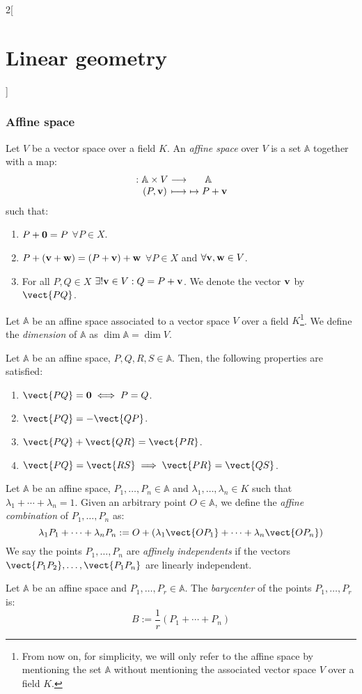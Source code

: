 \documentclass[../../../main.tex]{subfiles}
\begin{document}
\begin{multicols}{2}[\section{Linear geometry}]
  \subsubsection{Affine space}
  \begin{definition}
    Let $V$ be a vector space over a field $K$. An \emph{affine space} over $V$ is a set $\mathbb{A}$ together with a map:
    $$\function{}{\mathbb{A}\times V}{\mathbb{A}}{(P,\vf{v})}{\mapsto P+\vf{v}}$$
    such that:
    \begin{enumerate}
      \item $P+\boldsymbol{\mathrm{0}}=P$ $\forall P\in X$.
      \item $P+(\boldsymbol{\mathrm{v}}+\boldsymbol{\mathrm{w}})=(P+\boldsymbol{\mathrm{v}})+\boldsymbol{\mathrm{w}}$ $\forall P\in X$ and $\forall\boldsymbol{\mathrm{v}},\boldsymbol{\mathrm{w}}\in V$.
      \item For all $P,Q\in X$ $\exists!\boldsymbol{\mathrm{v}}\in V:Q=P+\boldsymbol{\mathrm{v}}$. We denote the vector $\boldsymbol{\mathrm{v}}$ by $\vect{PQ}$.
    \end{enumerate}
  \end{definition}
  \begin{definition}
    Let $\mathbb{A}$ be an affine space associated to a vector space $V$ over a field $K$\footnote{From now on, for simplicity, we will only refer to the affine space by mentioning the set $\mathbb{A}$ without mentioning the associated vector space $V$ over a field $K$.}. We define the \emph{dimension} of $\mathbb{A}$ as $\dim\mathbb{A}=\dim V$.
  \end{definition}
  \begin{proposition}
    Let $\mathbb{A}$ be an affine space, $P,Q,R,S\in\mathbb{A}$. Then, the following properties are satisfied:
    \begin{enumerate}
      \item $\vect{PQ}=\vf{0}\iff P=Q$.
      \item $\vect{PQ}=-\vect{QP}$.
      \item $\vect{PQ}+\vect{QR}=\vect{PR}$.
      \item $\vect{PQ}=\vect{RS}\implies\vect{PR}=\vect{QS}$.
    \end{enumerate}
  \end{proposition}
  \begin{definition}
    Let $\mathbb{A}$ be an affine space, $P_1,\ldots,P_n\in\mathbb{A}$ and $\lambda_1,\ldots,\lambda_n\in K$ such that $\lambda_1+\cdots+\lambda_n=1$. Given an arbitrary point $O\in\mathbb{A}$, we define the \emph{affine combination} of $P_1,\ldots,P_n$ as: $$\lambda_1P_1+\cdots+\lambda_nP_n:=O+\left(\lambda_1\vect{OP_1}+\cdots+\lambda_n\vect{OP_n}\right)$$ We say the points $P_1,\ldots,P_n$ are \emph{affinely independents} if the vectors $\vect{P_1P_2},\ldots,\vect{P_1P_n}$ are linearly independent.
  \end{definition}
  \begin{definition}
    Let $\mathbb{A}$ be an affine space and $P_1,\ldots,P_r\in\mathbb{A}$. The \emph{barycenter} of the points $P_1,\ldots,P_r$ is: $$B:=\frac{1}{r}\left(P_1+\cdots+P_n\right)$$
  \end{definition}

\end{multicols}
\end{document}

